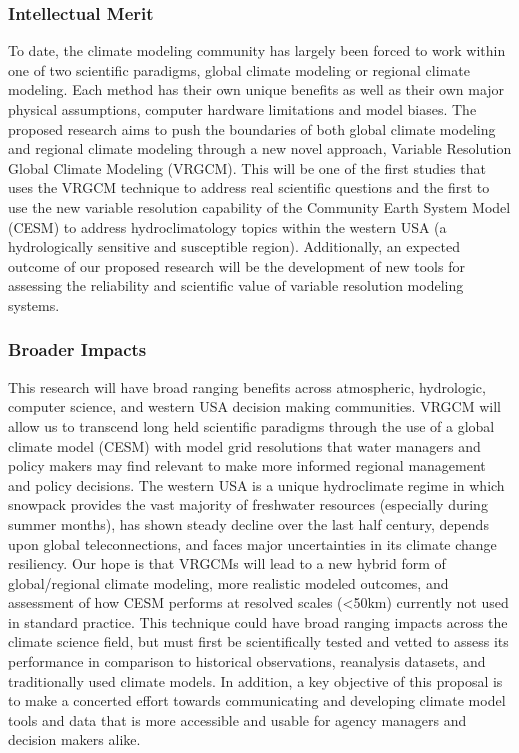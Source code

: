 \documentclass[11pt]{article}
\begin{document}
\subsubsection{Intellectual Merit}
To date, the climate modeling community has largely been forced to work within one of two scientific paradigms, global climate modeling or regional climate modeling.  Each method has their own unique benefits as well as their own major physical assumptions, computer hardware limitations and model biases.  The proposed research aims to push the boundaries of both global climate modeling and regional climate modeling through a new novel approach, Variable Resolution Global Climate Modeling (VRGCM).  This will be one of the first studies that uses the VRGCM technique to address real scientific questions and the first to use the new variable resolution capability of the Community Earth System Model (CESM) to address hydroclimatology topics within the western USA (a hydrologically sensitive and susceptible region).  Additionally, an expected outcome of our proposed research will be the development of new tools for assessing the reliability and scientific value of variable resolution modeling systems. 

\subsubsection{Broader Impacts}
This research will have broad ranging benefits across atmospheric, hydrologic, computer science, and western USA decision making communities.  VRGCM will allow us to transcend long held scientific paradigms through the use of a global climate model (CESM) with model grid resolutions that water managers and policy makers may find relevant to make more informed regional management and policy decisions.  The western USA is a unique hydroclimate regime in which snowpack provides the vast majority of freshwater resources (especially during summer months), has shown steady decline over the last half century, depends upon global teleconnections, and faces major uncertainties in its climate change resiliency.  Our hope is that VRGCMs will lead to a new hybrid form of global/regional climate modeling, more realistic modeled outcomes, and assessment of how CESM performs at resolved scales (<50km) currently not used in standard practice.  This technique could have broad ranging impacts across the climate science field, but must first be scientifically tested and vetted to assess its performance in comparison to historical observations, reanalysis datasets, and traditionally used climate models.  In addition, a key objective of this proposal is to make a concerted effort towards communicating and developing climate model tools and data that is more accessible and usable for agency managers and decision makers alike.
\end{document}
